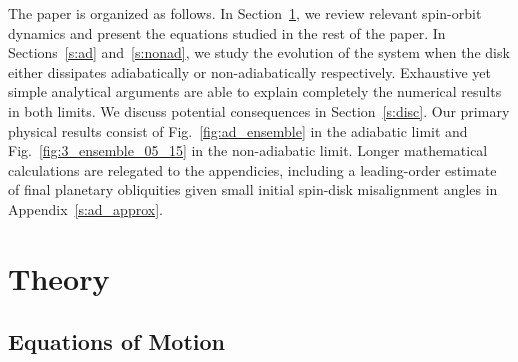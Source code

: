 \documentclass[
        fleqn,
        usenatbib,
        referee,
    ]{mnras}
\begin{document}
The paper is organized as follows. In Section~\ref{s:eq}, we review relevant
spin-orbit dynamics and present the equations studied in the rest of the paper.
In Sections~\ref{s:ad} and~\ref{s:nonad}, we study the evolution of the system
when the disk either dissipates adiabatically or non-adiabatically respectively.
Exhaustive yet simple analytical arguments are able to explain completely the
numerical results in both limits. We discuss potential consequences in
Section~\ref{s:disc}. Our primary physical results consist of
Fig.~\ref{fig:ad_ensemble} in the adiabatic limit and
Fig.~\ref{fig:3_ensemble_05_15} in the non-adiabatic limit. Longer mathematical
calculations are relegated to the appendicies, including a leading-order
estimate of final planetary obliquities given small initial spin-disk
misalignment angles in Appendix~\ref{s:ad_approx}.

\section{Theory}\label{s:eq}

\subsection{Equations of Motion}
\end{document}
